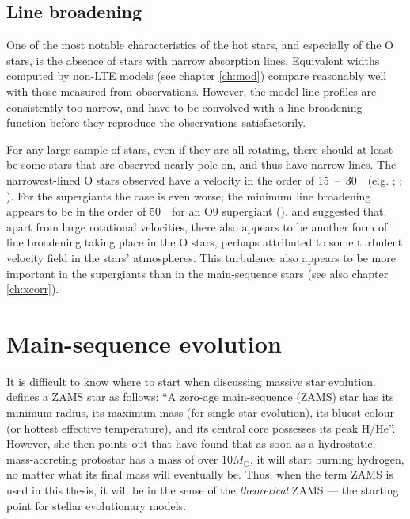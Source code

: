 \subsection{Line broadening}
One of the most notable characteristics of the hot stars, and
especially of the O stars, is the absence of stars with narrow
absorption lines. Equivalent widths computed by non-LTE models (see chapter
\ref{ch:mod}) compare reasonably well with those measured from observations.
However, the model line profiles are consistently too narrow, and have
to be convolved with a line-broadening function before they reproduce the
observations satisfactorily. 

For any large sample of stars, even if they are all rotating, there
should at least be some stars that are observed nearly pole-on, and
thus have narrow lines. The narrowest-lined O stars observed have a
velocity in the order of 15~--~30~\kms\ (e.g. \cite{co:vii};
\cite{pe:xcorr};
\cite{ho:xcorr}). For the supergiants the case is even worse; the
minimum line broadening appears to be in the order of 50~\kms\ for an
O9 supergiant ().  and 
suggested that, apart from large rotational velocities, there also
appears to be another form of line broadening taking place in the O
stars, perhaps attributed to some turbulent velocity field in the
stars' atmospheres. This turbulence also appears to be more important
in the supergiants than in the main-sequence stars (see also chapter
\ref{ch:xcorr}).

\section{Main-sequence evolution}

It is difficult to know where to start when discussing massive star
evolution.  defines a ZAMS star as follows: ``A zero-age
main-sequence (ZAMS) star has its minimum radius, its maximum mass
(for single-star evolution), its bluest colour (or hottest effective
temperature), and its central core possesses its peak H/He''. However,
she then points out that  have found that as soon as a
hydrostatic, mass-accreting protostar has a mass of over $10M_\odot$,
it will start burning hydrogen, no matter what its final mass will
eventually be. Thus, when the term ZAMS is used in this thesis, it
will be in the sense of the \emph{theoretical} ZAMS --- the starting
point for stellar evolutionary models.

